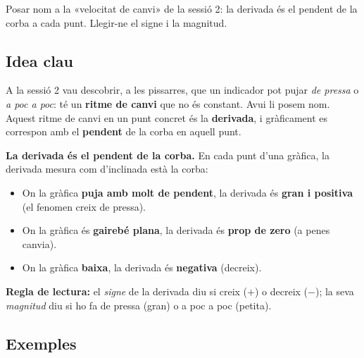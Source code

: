 %
{Posar nom a la «velocitat de canvi» de la sessió 2: la derivada és el pendent de la corba a cada punt. Llegir-ne el signe i la magnitud.}

\subsection{Idea clau}

A la sessió 2 vau descobrir, a les pissarres, que un indicador pot pujar \emph{de
pressa} o \emph{a poc a poc}: té un \textbf{ritme de canvi} que no és constant. Avui
li posem nom. Aquest ritme de canvi en un punt concret és la \textbf{derivada}, i
gràficament es correspon amb el \textbf{pendent} de la corba en aquell punt.

\begin{idea}
\textbf{La derivada és el pendent de la corba.} En cada punt d'una gràfica, la
derivada mesura com d'inclinada està la corba:
\begin{itemize}[leftmargin=1.4em, itemsep=2pt]
  \item On la gràfica \textbf{puja amb molt de pendent}, la derivada és
        \textbf{gran i positiva} (el fenomen creix de pressa).
  \item On la gràfica és \textbf{gairebé plana}, la derivada és \textbf{prop de zero}
        (a penes canvia).
  \item On la gràfica \textbf{baixa}, la derivada és \textbf{negativa} (decreix).
\end{itemize}
\textbf{Regla de lectura:} el \emph{signe} de la derivada diu si creix ($+$) o decreix
($-$); la seva \emph{magnitud} diu si ho fa de pressa (gran) o a poc a poc (petita).
\end{idea}

\subsection{Exemples}

